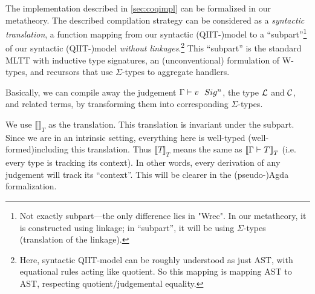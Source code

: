 The implementation described in \cref{sec:coqimpl} can be formalized in
our metatheory. The described compilation strategy can be considered as
a \textit{syntactic translation}, a function mapping from our syntactic
(QIIT-)model to a ``subpart''\footnote{Not exactly subpart---the only
difference lies in "Wrec". In our metatheory, it is constructed
using linkage; in ``subpart'', it will be using $\Sigma$-types (translation
of the linkage).} of our syntactic (QIIT-)model \textit{without
linkages}.\footnote{Here, syntactic QIIT-model can be roughly understood
as just AST, with equational rules acting like quotient. So this mapping
is mapping AST to AST, respecting quotient/judgemental equality.} This
``subpart'' is the standard MLTT with inductive type signatures, an
(unconventional) formulation of W-types,
and recursors that use $\Sigma$-types to aggregate handlers.

Basically, we can compile away the judgement ${ {\Gamma} \vdash {v} \ \ Sig^{n} }$,
the type ${\mathcal{L}}$ and ${\mathcal{C}}$, and related terms, by transforming them into
corresponding $\Sigma$-types.

 

\newcommand{\denotesT}[1]{{{\llbracket {#1} \rrbracket}_T}}
\newcommand{\Sigr}[2]{{ "Sig"^r~{#1}~{#2} }}

We use $\denotesT{}$ as the translation. This translation is invariant
under the subpart. Since we are in an intrinsic setting, everything here
is well-typed (well-formed)including this translation. Thus
$\denotesT{T}$ means the same as $\denotesT{\goodType{\Gamma}{T}{}}$
(i.e. every type is tracking its context). In other words, every
derivation of any judgement will track its ``context''. This will be
clearer in the (pseudo-)Agda formalization.

